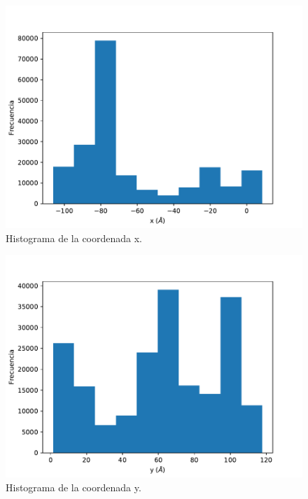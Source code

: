 \documentclass[12pt,letterpaper]{article}
\begin{document}
\begin{figure}[H]
\includegraphics{x_hist.pdf}
\caption{Histograma de la coordenada x.}
\centering
\end{figure}

\begin{figure}[H]
\includegraphics{y_hist.pdf}
\caption{Histograma de la coordenada y.}
\centering
\end{figure}
\end{document}
